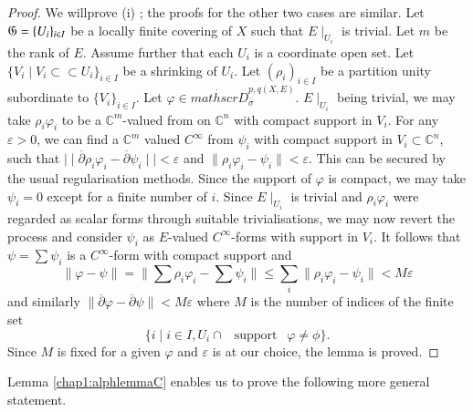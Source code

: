 \begin{proof}
  We will\pageoriginale prove (i) ; the proofs for the other two cases
  are similar.  
  Let $ \mathfrak{G}= \{U_i \}_{i \in I}$ be a locally finite covering of
  $X$ such that $E \mid_{U_i}$ is trivial. Let $m$ be the rank of $E$. Assume
  further that each $U_i$ is a coordinate open set. Let $\{ V_i \mid V_i
  \subset \subset U_i\}_{i \in I}$ be a shrinking of $U_i$. Let
  $(\rho_i)_{ i \in I} $ be a partition unity subordinate  to $\{V_{i}
  \}_{i \in I}$. Let $\varphi \in
  \dot{mathscr{D}}_{\overline{\sigma}}^{p,q(X,E)}$. $E \mid_{U_i}$
  being trivial, we may take $\rho_{i} \varphi_{i}$ to be a
  $\mathbb{C}^m$-valued 
  from on  $\mathbb{C}^n$ with compact support in $V_i$. For any
  $\varepsilon > 0$, we can 
  find a  $\mathbb{C}^m$ valued $C^\infty$ from $\psi_i$ with compact support in
  $V_i \subset \mathbb{C}^n$, such that $\mid \mid {\overline{\partial}}
  \rho_i \varphi_i - {\overline{\partial}} \psi_i \mid \mid < \varepsilon$
  and $\| \rho_i \varphi_i - \psi_i \| < \varepsilon$. This can be secured by
  the usual regularisation methods. Since the support of $\varphi$ is
  compact, we may take $\psi_i = 0$ except for a finite number of
  $i$. Since $E\mid _{U_i}$ is trivial and $\rho_i \varphi_i$ were
  regarded as scalar forms through suitable trivialisations, we may now
  revert the process and consider $\psi_i$ as $E$-valued $C^\infty$-forms
  with support in $V_i$. It follows that $\psi = \sum \psi_i$ is a
  $C^\infty$-form with compact support and 
$$
\| \varphi - \psi \| = \|
  \sum \rho_i \varphi_i - \sum \psi_i \| \leq {\underset{i}{\sum}}\|
  \rho_i \varphi_i - \psi_i \| < M\varepsilon
$$
 and similarly $\| {\overline{\partial}}\varphi -
 {\overline{\partial}} \psi \| < M \varepsilon$ where $M$ is the number of
 indices of the finite set  
 $$ 
 \{ i \mid i \in I, U_i \cap  ~~\text{ support } ~~ \varphi \neq
 \phi\}.
$$
Since $M$ is fixed for a given $\varphi$ and $\varepsilon$ is at our
 choice, the lemma is proved. 
\end{proof}
  
Lemma \ref{chap1:alphlemmaC} enables us to prove the following more
general statement. 

